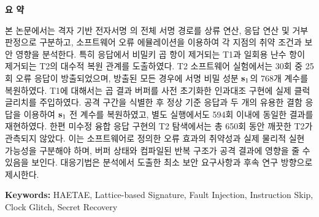 \begin{center}
\textbf{요 약}
\end{center}

본 논문에서는 격자 기반 전자서명 의 전체 서명 경로를
상류 연산, 응답 연산 및 거부 판정으로 구분하고, 소프트웨어 오류
에뮬레이션을 이용하여 각 지점의 취약 조건과 보안 영향을 분석한다.
특히 응답에서 비밀키 곱 항이 제거되는 T1과 일회용 난수 항이 제거되는
T2의 대수적 복원 관계를 도출하였다. T2 소프트웨어 실험에서는 30회 중
25회 오류 응답이 방출되었으며, 방출된 모든 경우에 서명 비밀 성분
$\mathbf{s}_1$의 768개 계수를 복원하였다. T1에 대해서는 곱 결과 버퍼를
사전 초기화한 인과대조 구현에 실제 클럭 글리치를 주입하였다. 공격
구간을 식별한 후 정상 기준 응답과 두 개의 유용한 결함 응답을 이용하여
$\mathbf{s}_1$ 전 계수를 복원하였고, 별도 실행에서도 594회 이내에 동일한
결과를 재현하였다. 한편 미수정 융합 응답 구현의 T2 탐색에서는 총
650회 동안 깨끗한 T2가 관측되지 않았다. 이는 소프트웨어로 정의한
오류 효과의 취약성과 실제 물리적 실현 가능성을 구분해야 하며, 버퍼
상태와 컴파일된 반복 구조가 공격 결과에 영향을 줄 수 있음을 보인다.
대응기법은 분석에서 도출한 최소 보안 요구사항과 후속 연구 방향으로
제시한다.

\vspace{0.4em}
\noindent\textbf{Keywords:} HAETAE, Lattice-based Signature, Fault Injection,
Instruction Skip, Clock Glitch, Secret Recovery
